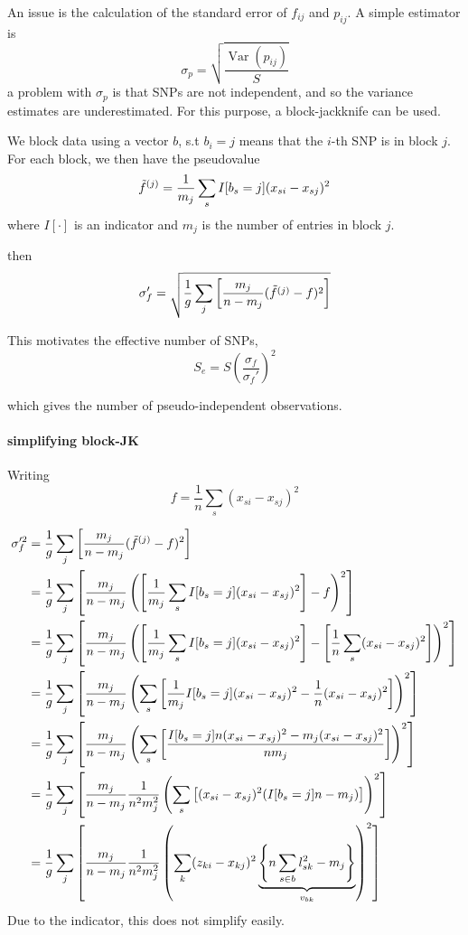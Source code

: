 \documentclass[12pt, letterpaper]{article}
\begin{document}
An issue is the calculation of the standard error of $f_{ij}$ and $p_{ij}$. A simple estimator is 
\begin{equation}
    \sigma_p = \sqrt{\frac{\operatorname{Var}(p_{ij})}{S} }
\end{equation}
a problem with $\sigma_p$ is that SNPs are not independent, and so the variance estimates are underestimated. For this purpose, a block-jackknife can be used.

We block data using a vector $b$, s.t $b_i = j$ means that the $i$-th SNP is in block $j$. For each block, we then have the pseudovalue 
$$\Tilde{f}^{(j)} = \frac{1}{m_j} \sum_s I[b_s =j] (x_{si} - x_{sj})^2  $$
where $I[\cdot]$ is an indicator and $m_j$ is the number of entries in block $j$.

then
\begin{equation}
    \sigma_f' = \sqrt{ \frac{1}{g} \sum_j \left[ \frac{m_j}{n-m_j}( \Tilde{f}^{(j)} - f)^2  \right] }
\end{equation}

This motivates the effective number of SNPs, 
\begin{equation}
    S_e = S \left(\frac{ \sigma_f}{\sigma_f'} \right)^2
\end{equation}

which gives the number of pseudo-independent observations.

\paragraph{simplifying block-JK}
Writing
$$f = \frac{1}{n}\sum_s (x_{si} - x_{sj})^2$$


\begin{align}
    \sigma_f'^2 &=  \frac{1}{g} \sum_j \left[ \frac{m_j}{n-m_j}( \Tilde{f}^{(j)} - f)^2  \right] \\
    &= \frac{1}{g} \sum_j \left[ \frac{m_j}{n-m_j} \left(  \left[ \frac{1}{m_j} \sum_s I[b_s =j] (x_{si} - x_{sj})^2\right] - f\right)^2  \right]\\
&= \frac{1}{g} \sum_j \left[ \frac{m_j}{n-m_j} \left(  \left[ \frac{1}{m_j} \sum_s I[b_s =j] (x_{si} - x_{sj})^2\right] - \left[\frac{1}{n}\sum_s (x_{si} - x_{sj})^2\right] \right)^2  \right]\\    
&= \frac{1}{g} \sum_j \left[ \frac{m_j}{n-m_j} \left(  \sum_s \left[ \frac{1}{m_j} I[b_s =j] (x_{si} - x_{sj})^2 - \frac{1}{n} (x_{si} - x_{sj})^2\right] \right)^2  \right]\\    
&= \frac{1}{g} \sum_j \left[ \frac{m_j}{n-m_j} \left(  \sum_s \left[ \frac{  I[b_s =j] n (x_{si} - x_{sj})^2 - m_j(x_{si} - x_{sj})^2 }{n m_j}   \right] \right)^2  \right]\\    
&= \frac{1}{g} \sum_j \left[ \frac{m_j}{n-m_j}\frac{1}{n^2m_j^2} \left(   \sum_s \left[  (x_{si} - x_{sj})^2 ( I[b_s =j] n  - m_j)    \right] \right)^2\right]\\    
&= \frac{1}{g} \sum_j \left[ \frac{m_j}{n-m_j}\frac{1}{n^2m_j^2} \left(   \sum_k (z_{ki} - x_{kj})^2 \underbrace{ \left\{n \sum_{s \in b}  l_{sk}^2  - m_j \right\}}_{ v_{bk}} \right)^2\right]\\    
\end{align}
Due to the indicator, this does not simplify easily.
\end{document}

